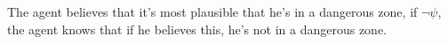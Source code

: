 \documentclass[leqno]{article}
\begin{document}
\begin{enumerate}
    The agent believes that it's most plausible that he's in a dangerous zone,
    if $\neg \psi$, the agent knows that if he believes this, he's not in a
    dangerous zone.

    \begin{center}
    \end{center}

\end{enumerate}
\end{document}
